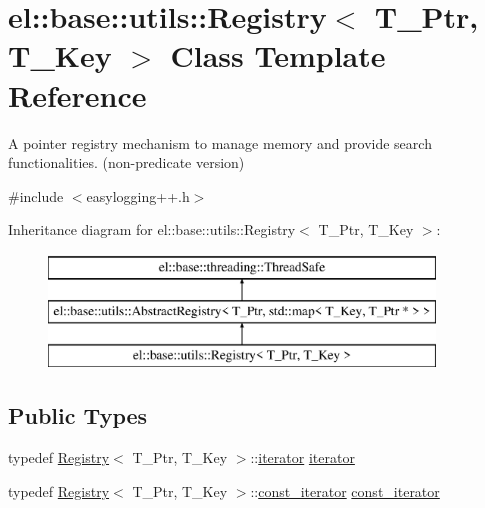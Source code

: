 \hypertarget{classel_1_1base_1_1utils_1_1_registry}{}\section{el\+:\+:base\+:\+:utils\+:\+:Registry$<$ T\+\_\+\+Ptr, T\+\_\+\+Key $>$ Class Template Reference}
\label{classel_1_1base_1_1utils_1_1_registry}


A pointer registry mechanism to manage memory and provide search functionalities. (non-\/predicate version)  




{\ttfamily \#include $<$easylogging++.\+h$>$}

Inheritance diagram for el\+:\+:base\+:\+:utils\+:\+:Registry$<$ T\+\_\+\+Ptr, T\+\_\+\+Key $>$\+:\begin{figure}[H]
\begin{center}
\leavevmode
\includegraphics[height=3.000000cm]{classel_1_1base_1_1utils_1_1_registry}
\end{center}
\end{figure}
\subsection*{Public Types}
\begin{DoxyCompactItemize}
\item 
typedef \hyperlink{classel_1_1base_1_1utils_1_1_registry}{Registry}$<$ T\+\_\+\+Ptr, T\+\_\+\+Key $>$\+::\hyperlink{classel_1_1base_1_1utils_1_1_registry_a31f3d725285e6b65f1f9e990066f96ed}{iterator} \hyperlink{classel_1_1base_1_1utils_1_1_registry_a31f3d725285e6b65f1f9e990066f96ed}{iterator}
\item 
typedef \hyperlink{classel_1_1base_1_1utils_1_1_registry}{Registry}$<$ T\+\_\+\+Ptr, T\+\_\+\+Key $>$\+::\hyperlink{classel_1_1base_1_1utils_1_1_registry_a955e62adc74c60d0205b52a3fc430cef}{const\+\_\+iterator} \hyperlink{classel_1_1base_1_1utils_1_1_registry_a955e62adc74c60d0205b52a3fc430cef}{const\+\_\+iterator}
\end{DoxyCompactItemize}
